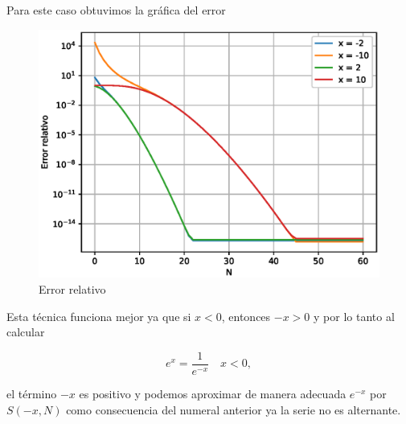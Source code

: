 \documentclass[12pt, a4paper]{article}%
\begin{document}
\begin{itemize}
\begin{solution}
    Para este caso obtuvimos la gráfica del error

    \begin{figure}[H]
        \centering
        \includegraphics[width=0.75\linewidth]{Gráficas/AN-T1-P4B.eps}
        \caption{Error relativo}
        \label{coyo4B}
    \end{figure}

    Esta técnica funciona mejor ya que si $x<0$, entonces $-x>0$ y por lo tanto al calcular 

    $$e^x=\dfrac{1}{e^{-x}}\quad x<0,$$

    el término $-x$ es positivo y podemos aproximar de manera adecuada $e^{-x}$ por $S(-x,N)$ como consecuencia del numeral anterior ya la serie no es alternante.
\end{solution}
    
\end{itemize}
\end{document}

